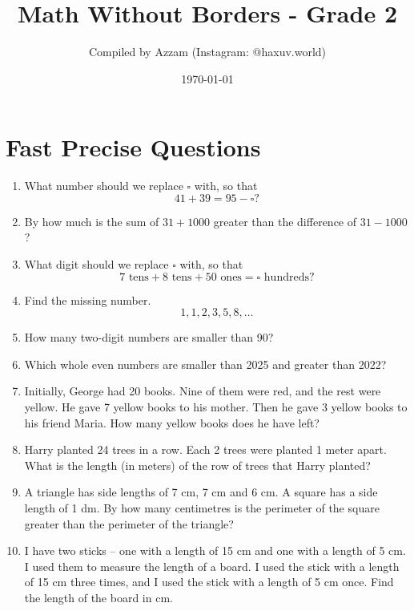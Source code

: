 \documentclass[11pt]{scrartcl}
\title{Math Without Borders - Grade 2}
\author{Compiled by Azzam (Instagram: @haxuv.world)}
\date{\today}
\begin{document}
\maketitle

\section*{Fast Precise Questions}
\begin{enumerate}
\item What number should we replace $\square$ with, so that
    \[ 41 + 39 = 95 - \square ? \]

\item By how much is the sum of $31+1000$ greater than the difference of
    $31 - 1000$?

\item What digit should we replace $\square$ with, so that
    \[ 7 \text{ tens} + 8 \text{ tens} + 50 \text{ ones} = \square \text{ hundreds}? \]

\item Find the missing number.
    \[ 1, 1, 2, 3, 5, 8, \dots \]

\item How many two-digit numbers are smaller than 90?

\item Which whole even numbers are smaller than 2025 and greater than 2022?

\item Initially, George had 20 books. Nine of them were red, and the rest were yellow. He gave 7 yellow books to his mother. Then he gave 3 yellow books to his friend Maria. How many yellow books does he have left?

\item Harry planted 24 trees in a row. Each 2 trees were planted 1 meter apart. What is the length (in meters) of the row of trees that Harry planted?

\item A triangle has side lengths of 7 cm, 7 cm and 6 cm. A square has a side length of 1 dm. By how many centimetres is the perimeter of the square greater than the perimeter of the triangle?

\item I have two sticks – one with a length of 15 cm and one with a length of 5 cm. I used them to measure the length of a board. I used the stick with a length of 15 cm three times, and I used the stick with a length of 5 cm once. Find the length of the board in cm.


\end{enumerate}
\end{document}
